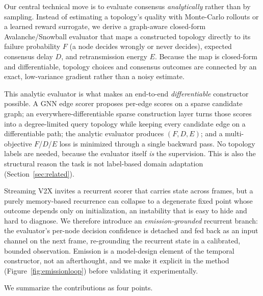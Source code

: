 \documentclass[journal]{IEEEtran}
\begin{document}
Our central technical move is to evaluate consensus \emph{analytically} rather
than by sampling. Instead of estimating a topology's quality with Monte-Carlo
rollouts or a learned reward surrogate, we derive a graph-aware closed-form
Avalanche/Snowball evaluator that maps a constructed topology directly to its
failure probability $F$ (a node decides wrongly or never decides), expected
consensus delay $D$, and retransmission energy $E$. Because the map is
closed-form and differentiable, topology choices and consensus outcomes are
connected by an exact, low-variance gradient rather than a noisy estimate.

This analytic evaluator is what makes an end-to-end \emph{differentiable}
constructor possible. A GNN edge scorer proposes per-edge scores on a sparse
candidate graph; an everywhere-differentiable sparse construction layer turns
those scores into a degree-limited query topology while keeping every candidate
edge on a differentiable path; the analytic evaluator produces $(F,D,E)$; and a
multi-objective $F$/$D$/$E$ loss is minimized through a single backward pass.
No topology labels are needed, because the evaluator itself \emph{is} the
supervision. This is also the structural reason the task is not label-based
domain adaptation (Section~\ref{sec:related}).

Streaming V2X invites a recurrent scorer that carries state across frames, but a
purely memory-based recurrence can collapse to a degenerate fixed point whose
outcome depends only on initialization, an instability that is easy to hide and
hard to diagnose. We therefore introduce an \emph{emission-grounded} recurrent
branch: the evaluator's per-node decision confidence is detached and fed back as
an input channel on the next frame, re-grounding the recurrent state in a
calibrated, bounded observation. Emission is a model-design element of the
temporal constructor, not an afterthought, and we make it explicit in the method
(Figure~\ref{fig:emissionloop}) before validating it experimentally.

We summarize the contributions as four points.
\end{document}
